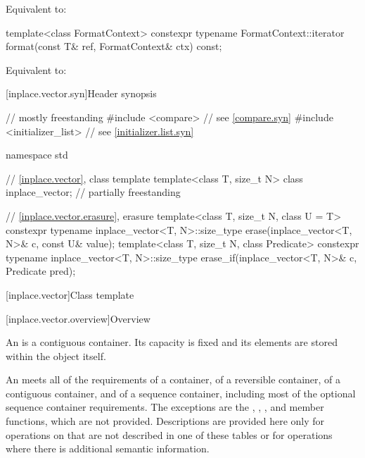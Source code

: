 \begin{itemdescr}
\pnum
Equivalent to: 
\end{itemdescr}

%
\begin{itemdecl}
template<class FormatContext>
  constexpr typename FormatContext::iterator
    format(const T& ref, FormatContext& ctx) const;
\end{itemdecl}

\begin{itemdescr}
\pnum
Equivalent to: 
\end{itemdescr}

[inplace.vector.syn]{Header  synopsis}

%
\begin{codeblock}
// mostly freestanding
#include <compare>              // see \ref{compare.syn}
#include <initializer_list>     // see \ref{initializer.list.syn}

namespace std {
  // \ref{inplace.vector}, class template 
  template<class T, size_t N> class inplace_vector;             // partially freestanding

  // \ref{inplace.vector.erasure}, erasure
  template<class T, size_t N, class U = T>
    constexpr typename inplace_vector<T, N>::size_type
      erase(inplace_vector<T, N>& c, const U& value);
  template<class T, size_t N, class Predicate>
    constexpr typename inplace_vector<T, N>::size_type
      erase_if(inplace_vector<T, N>& c, Predicate pred);
}
\end{codeblock}

[inplace.vector]{Class template }

[inplace.vector.overview]{Overview}

\pnum
{}%
An  is a contiguous container.
Its capacity is fixed and
its elements are stored within the  object itself.

\pnum
An  meets all of the requirements
of a container,
of a reversible container,
of a contiguous container, and
of a sequence container,
including most of the optional sequence container requirements.
The exceptions are the
,
,
, and
member functions, which are not provided.
Descriptions are provided here only
for operations on  that
are not described in one of these tables or
for operations where there is additional semantic information.


